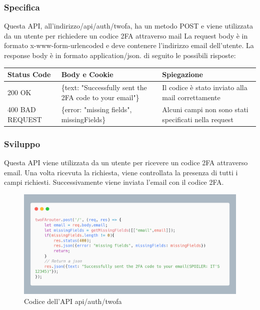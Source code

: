 \documentclass{report}
\begin{document}
\subsubsection*{Specifica}
Questa API, all'indirizzo/api/auth/twofa, ha un metodo POST e viene utilizzata da un utente per richiedere un codice 2FA attraverso mail
La request body è in formato x-www-form-urlencoded e deve contenere l'indirizzo email dell'utente.
La response body è in formato application/json. di seguito le possibili risposte:
\begin{center} %
	\centering
	\begin{tabular}{ |p{4cm}|p{5cm}|p{4cm}| }
		\hline
		\centering Status Code & \qquad\quad Body e Cookie & \qquad\qquad Spiegazione\\ %
		\hline
		200 OK & \{text: "Successfully sent the 2FA code to your email"\} &  Il codice è stato inviato alla mail correttamente\\
		\hline
		400 BAD REQUEST & \{error: "missing fields", missingFields\} & Alcuni campi non sono stati specificati nella request\\ %
		\hline
	\end{tabular}
\end{center}

\subsubsection*{Sviluppo}
Questa API viene utilizzata da un utente per ricevere un codice 2FA attraverso email.
Una volta ricevuta la richiesta, viene controllata la presenza di tutti i campi richiesti.
Successivamente viene inviata l'email con il codice 2FA.

\begin{figure}[H]
	\centering\includegraphics[width=1\textwidth]{images/microservizio-autenticazione/twofa-carbon.png}
	Codice dell'API api/auth/twofa
\end{figure}
\end{document}
